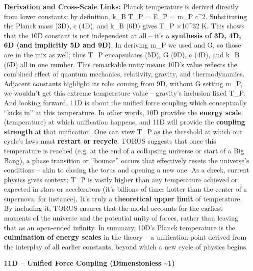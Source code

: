 \documentclass[
]{article}
\begin{document}
{\textbf{Derivation and Cross-Scale Links:} Planck temperature is derived
directly from lower constants: by definition, k\_B T\_P = E\_P = m\_P
c\^{}2\hspace{0pt}. Substituting the Planck mass (3D), c (4D), and k\_B
(6D) gives T\_P ×10\^{}32 K\hspace{0pt}. This shows that the 10D
constant is not independent at all -- it's a \textbf{synthesis of 3D,
4D, 6D (and implicitly 5D and 9D)}\hspace{0pt}. In deriving m\_P we used
\hbar and G, so those are in the mix as well; thus T\_P encapsulates \hbar (5D),
G (9D), c (4D), and k\_B (6D) all in one number\hspace{0pt}. This
remarkable unity means 10D's value reflects the combined effect of
quantum mechanics, relativity, gravity, and thermodynamics. Adjacent
constants highlight its role: coming from 9D, without G setting m\_P, we
wouldn't get this extreme temperature value -- gravity's inclusion fixed
T\_P. And looking forward, 11D is about the unified force coupling which
conceptually ``kicks in'' at this temperature. In other words, 10D
provides the \textbf{energy scale} (temperature) at which unification
happens, and 11D will provide the \textbf{coupling strength} at that
unification\hspace{0pt}. One can view T\_P as the threshold at which our
cycle's laws must \textbf{restart or recycle}. TORUS suggests that once
this temperature is reached (e.g. at the end of a collapsing universe or
start of a Big Bang), a phase transition or ``bounce'' occurs that
effectively resets the universe's conditions -- akin to closing the
torus and opening a new one\hspace{0pt}. As a check, current physics
gives context: T\_P is vastly higher than any temperature achieved or
expected in stars or accelerators (it's billions of times hotter than
the center of a supernova, for instance). It's truly a
\textbf{theoretical upper limit} of temperature. By including it, TORUS
ensures that the model accounts for the earliest moments of the universe
and the potential unity of forces, rather than leaving that as an
open-ended infinity. In summary, 10D's Planck temperature is the
\textbf{culmination of energy scales} in the theory -- a unification
point derived from the interplay of all earlier constants, beyond which
a new cycle of physics begins.

\textbf{11D -- Unified Force Coupling (Dimensionless \textasciitilde1)}

}
\end{document}
